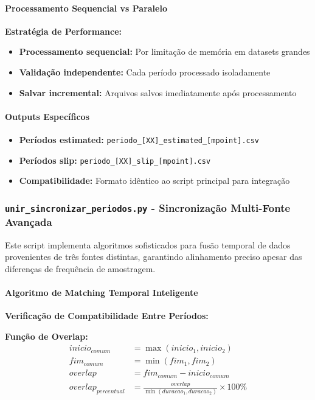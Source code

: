 \paragraph{Processamento Sequencial vs Paralelo}

\textbf{Estratégia de Performance:}
\begin{itemize}
    \item \textbf{Processamento sequencial:} Por limitação de memória em datasets grandes
    \item \textbf{Validação independente:} Cada período processado isoladamente
    \item \textbf{Salvar incremental:} Arquivos salvos imediatamente após processamento
\end{itemize}

\paragraph{Outputs Específicos}

\begin{itemize}
    \item \textbf{Períodos estimated:} \texttt{periodo\_[XX]\_estimated\_[mpoint].csv}
    \item \textbf{Períodos slip:} \texttt{periodo\_[XX]\_slip\_[mpoint].csv}
    \item \textbf{Compatibilidade:} Formato idêntico ao script principal para integração
\end{itemize}

\subsubsection{\texttt{unir\_sincronizar\_periodos.py} - Sincronização Multi-Fonte Avançada}

Este script implementa algoritmos sofisticados para fusão temporal de dados provenientes de três fontes distintas, garantindo alinhamento preciso apesar das diferenças de frequência de amostragem.

\paragraph{Algoritmo de Matching Temporal Inteligente}

\textbf{Verificação de Compatibilidade Entre Períodos:}

\textbf{Função de Overlap:}
\begin{align}
inicio_{comum} &= \max(inicio_1, inicio_2) \\
fim_{comum} &= \min(fim_1, fim_2) \\
overlap &= fim_{comum} - inicio_{comum} \\
overlap_{percentual} &= \frac{overlap}{\min(duracao_1, duracao_2)} \times 100\%
\end{align}


